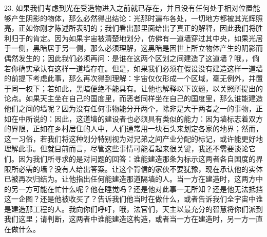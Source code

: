 23. 如果我们考虑到光在受造物进入之前就已存在，并且没有任何处于相对位置能够产生阴影的物体，那么必然得出结论：光那时遍布各处，一切地方都被其光辉照亮，正如你刚才陈述所表明的；我们看出那里面给出了真正的解释，因此我们将胜利归于的肯定。因为如果宇宙被清楚地划分，仿佛有一道墙穿过其中央，如果光居于一侧，黑暗居于另一侧，那么必须理解，这黑暗是因世上所立物体产生的阴影而偶然发生的；因此我们必须再问：是谁在这两个区划之间建造了这道墙？哦，，倘若你确实承认有这样一道墙存在。但是，如果我们必须在假设没有建造这样一道墙的前提下考虑此事，那么再次得到理解：宇宙仅仅形成一个区域，毫无例外，并置于同一权下；若如此，黑暗便绝不能具有。让他也解释以下议题，以关照所提出的论点。如果天主坐在自己的国度里，而恶者同样坐在自己的国度里，那么谁能建造他们之间的墙呢？因为没有任何事物能分开两个，除非是大于两者之一的事物，正如在中所说的：因此，这道墙的建设者也必须具有类似的能力：因为墙标志着双方的界限，正如在乡村居住的人中，人们通常用一块石头来划定各家的地界；然而，这一习俗，若我们将这种划分特别视为对兄弟之间产业分配的标记，或许能更好地理解此事。但就目前而言，尽管这些事情可能看起来很关键，我还不需要谈论它们。因为我们所寻求的是对问题的回答：谁能建造那条为标示这两者各自国度的界限所必需的墙？没有人给出答案。让这个背信的家伙不要犹豫，现在承认他的实体已被再次归结为。让他指出任何能建造那道隔墙的人。当一方在建造时，这两方中的另一方可能在忙什么呢？他在睡觉吗？还是他对此事一无所知？还是他无法抵挡这一企图？还是他被收买了？告诉我们他当时在做什么，或者告诉我们全宇宙中谁是建造那工程的人。我向你们呼吁，哦，法官们，天主以最充分的智慧将你们派到我们这里；请判断，这两者中谁能建造这构造，或者当一方在建造时，另一方一直在做什么。\par

